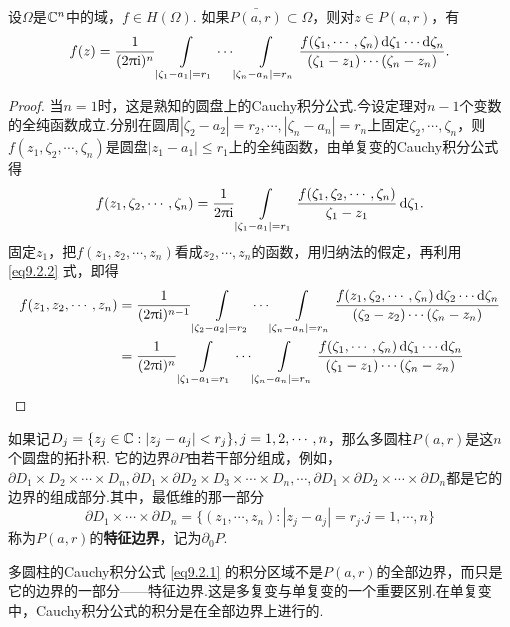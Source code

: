\begin{theorem}\label{thm9.2.1}
  设$\Omega$是$\mathbb C^n$中的域，$f\in H(\Omega)$. 如果$\bar{P(a,r)}\subset \Omega$，则对$z\in P(a,r)$，有
  \begin{equation}\label{eq9.2.1}
    f(z) = \frac1{(2\uppi\mathrm i)^n}\int\limits_{|\zeta_1-a_1|=r_1}\cdots\int\limits_{|\zeta_n-a_n|=r_n}
    \frac{f(\zeta_1,\cdots,\zeta_n)\mathop{}\!\mathrm{d} \zeta_1\cdots\mathop{}\!\mathrm{d} \zeta_n}{(\zeta_1-z_1)\cdots(\zeta_n-z_n)}.
  \end{equation}
\end{theorem}
\begin{proof}
  当$n=1$时，这是熟知的圆盘上的Cauchy积分公式.今设定理对$n-1$个变数的全纯函数成立.分别在圆周$|\zeta_2-a_2|=r_2,\cdots,|\zeta_n-a_n|=r_n$上固定$\zeta_2,\cdots,\zeta_n$，则$f(z_1,\zeta_2,\cdots,\zeta_n)$是圆盘$|z_1-a_1|\le r_1$上的全纯函数，由单复变的Cauchy积分公式得
  \begin{equation}\label{eq9.2.2}
    f(z_1,\zeta_2,\cdots,\zeta_n) = \frac1{2\uppi\mathrm i}\int\limits_{|\zeta_1-a_1|=r_1}
    \frac{f(\zeta_1,\zeta_2,\cdots,\zeta_n)}{\zeta_1-z_1}\mathop{}\!\mathrm{d} \zeta_1.
  \end{equation}
  固定$z_1$，把$f(z_1,z_2,\cdots,z_n)$看成$z_2,\cdots,z_n$的函数，用归纳法的假定，再利用 \eqref{eq9.2.2} 式，即得
  \begin{align*}
    f(z_1,z_2,\cdots,z_n)&=\frac1{(2\uppi\mathrm i)^{n-1}}\int\limits_{|\zeta_2-a_2|=r_2}\cdots\int\limits_{|\zeta_n-a_n|=r_n}
    \frac{f(z_1,\zeta_2,\cdots,\zeta_n)\mathop{}\!\mathrm{d} \zeta_2\cdots
    \mathop{}\!\mathrm{d} \zeta_n}{(\zeta_2-z_2)\cdots(\zeta_n-z_n)}\\
    & = \frac1{(2\uppi\mathrm i)^n}\int\limits_{|\zeta_1-a_1=r_1} \cdots\int\limits_{|\zeta_n-a_n|=r_n}
    \frac{f(\zeta_1,\cdots,\zeta_n)\mathop{}\!\mathrm{d} \zeta_1\cdots
    \mathop{}\!\mathrm{d} \zeta_n}{(\zeta_1-z_1)\cdots(\zeta_n-z_n)} \qedhere
  \end{align*}
\end{proof}

如果记$D_j=\{z_j\in\mathbb C:|z_j-a_j|<r_j\},j=1,2,\cdots,n$，那么多圆柱$P(a,r)$是这$n$个圆盘的拓扑积. 它的边界$\partial P$由若干部分组成，例如，$\partial D_1\times D_2\times\cdots\times D_n,\partial D_1\times\partial D_2\times D_3\times\cdots\times D_n,\cdots,\partial D_1\times\partial D_2\times\cdots\times\partial D_n$都是它的边界的组成部分.其中，最低维的那一部分
\[\partial D_1\times\cdots\times\partial D_n=\{(z_1,\cdots,z_n):|z_j-a_j|=r_j.j=1,\cdots,n\}\]
称为$P(a,r)$的\textbf{特征边界}，记为$\partial_0P$.

多圆柱的Cauchy积分公式 \eqref{eq9.2.1} 的积分区域不是$P(a,r)$的全部边界，而只是它的边界的一部分——特征边界.这是多复变与单复变的一个重要区别.在单复变中，Cauchy积分公式的积分是在全部边界上进行的.

